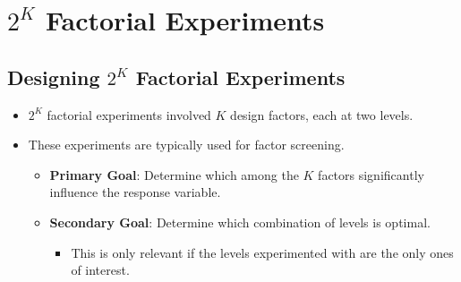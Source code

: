 \chapter{\texorpdfstring{$ 2^K $}{2K} Factorial Experiments}
\section{Designing \texorpdfstring{$ 2^K $}{2K} Factorial Experiments}
\begin{itemize}[*]
    \item $ 2^K $ factorial experiments involved $ K $ design factors, each at two levels.
\end{itemize}
\begin{itemize}
    \item These experiments are typically used for factor screening.
          \begin{itemize}[$\rightarrow$]
              \item \textbf{Primary Goal}: Determine which among the $ K $ factors significantly influence the response variable.
              \item \textbf{Secondary Goal}: Determine which combination of levels is optimal.
                    \begin{itemize}[$\hookrightarrow$]
                        \item This is only relevant if the levels experimented with are the only ones of interest.
                    \end{itemize}
          \end{itemize}
\end{itemize}
